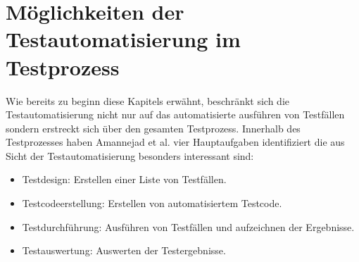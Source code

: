 \section{Möglichkeiten der Testautomatisierung im Testprozess}
\label{sec:bereiche_der_estautomatisierung}
Wie bereits zu beginn diese Kapitels erwähnt, beschränkt sich die Testautomatisierung nicht nur auf das automatisierte ausführen von Testfällen sondern erstreckt sich über den gesamten Testprozess. Innerhalb des Testprozesses haben Amannejad et al. \cite{amannejad_search-based_2014} vier Hauptaufgaben identifiziert die aus Sicht der Testautomatisierung besonders interessant sind:

\begin{itemize}
\item Testdesign: Erstellen einer Liste von Testfällen.
\item Testcodeerstellung: Erstellen von automatisiertem Testcode.
\item Testdurchführung: Ausführen von Testfällen und aufzeichnen der Ergebnisse.
\item Testauswertung: Auswerten der Testergebnisse.
\end{itemize}

